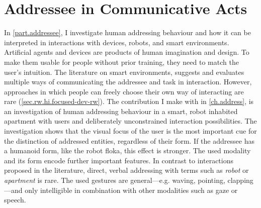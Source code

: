 \section{Addressee in Communicative Acts}
In \cref{part.addressee}, I investigate human addressing behaviour and how it can be interpreted in interactions with \glspl{device}, \glspl{robot}, and \glspl{smart environment}.
Artificial agents and \glspl{device} are products of human imagination and design.
To make them usable for people without prior training, they need to match the user's intuition.
The literature on \glspl{smart environment}, suggests and evaluates multiple ways of communicating the \gls{addressee} and task in interaction.
However, approaches in which people can freely choose their own way of interacting are rare (\cref{sec.rw.hi.focused-dev-rw}).
The contribution I make with  in \cref{ch.address}, is an investigation of human addressing behaviour in a smart, \gls{robot} inhabited \gls{apartment} with \naive{} users and deliberately unconstrained interaction possibilities.
The investigation shows that the visual focus of the user is the most important cue for the distinction of addressed entities, regardless of their form.
If the \gls{addressee} has a humanoid form, like the \gls{robot} \gls{floka}, this effect is stronger.
The used modality and its form encode further important features.
In contrast to interactions proposed in the literature, direct, verbal addressing with terms such as \emph{\gls{robot}} or \emph{\gls{apartment}} is rare.
The used gestures are general---e.g. waving, pointing, clapping---and only intelligible in combination with other modalities such as gaze or speech.

